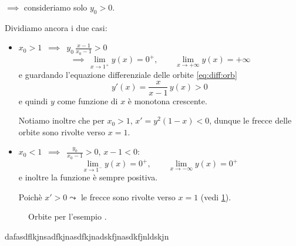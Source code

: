{\begin{enumerate}
\begin{enumerate}
        $\implies$ consideriamo solo $ y_0 >0$. 

        Dividiamo ancora i due casi: \begin{itemize}
            \item $ x_0>1 $ $ \,\implies\, $ $ \displaystyle y_0\,\frac{x-1}{x_0-1}>0 $\[
                \,\implies\,\lim_{x\to 1^{+}} y(x) = 0^{+},\qquad \lim_{x\to + \infty} y(x) = + \infty
            \]e guardando l'equazione differenziale delle orbite \eqref{eq:diff:orb}\[
                y'(x)=\frac{x}{x-1}\,y(x) >0
            \]e quindi $ y $ come funzione di $ x $ è monotona crescente.
            
            Notiamo inoltre che per $ x_0>1 $, $ x'=y^{2}(1-x)<0 $, dunque le frecce delle orbite sono rivolte verso $ x=1 $. 
            \item $ x_0<1 $ $ \,\implies\, $ $ \displaystyle \frac{y_0}{x_0-1}>0 $, $ x-1<0 $: \[
                \lim_{x\to 1^{-}} y(x) = 0^{+},\qquad \lim_{x\to - \infty} y(x) = 0^{+}
            \]e inoltre la funzione è sempre positiva. 

            Poichè $ x'>0 \leadsto$ le frecce sono rivolte verso $ x=1$ (vedi \ref{fig:orbitedivattelaapesce}).
        \end{itemize}
        \begin{figure}[H]
            \begin{center}
                
            \end{center}
            \caption{Orbite per l'esempio .}\label{fig:orbitedivattelaapesce}
        \end{figure}
    \end{enumerate}
\end{enumerate}
}{dafasdflkjnsadfkjnasdfkjnadskfjnasdkfjnldskjn}{}
